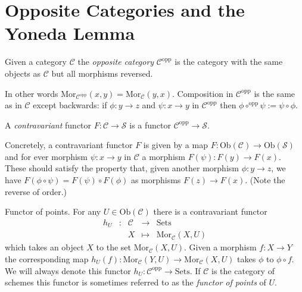 \section{Opposite Categories and the Yoneda Lemma}
\label{section-opposite}

\begin{definition}
\label{definition-opposite}
Given a category $\mathcal{C}$ the {\it opposite category}
$\mathcal{C}^{\text{opp}}$ is the category with the same objects
as $\mathcal{C}$ but all morphisms reversed.
\end{definition}

\noindent
In other
words $\text{Mor}_{\mathcal{C}^{\text{opp}}}(x,y) =
\text{Mor}_{\mathcal{C}}(y,x)$. Composition in $\mathcal{C}^{\text{opp}}$
is the same as in $\mathcal{C}$ except backwards: if $\phi : y \to z$ and
$\psi : x \to y$ in $\mathcal{C}^{\text{opp}}$ then
$\phi \circ^{\text{opp}} \psi := \psi \circ \phi$.

\begin{definition}
\label{definition-contravariant}
A {\it contravariant} functor $F\colon
\mathcal{C}\to \mathcal{S}$ is a functor $\mathcal{C}^{\text{opp}}\to
\mathcal{S}$.
\end{definition}

\noindent
Concretely, a contravariant functor $F$ is given
by a map $F : \text{Ob}(\mathcal{C}) \to 
\text{Ob}(\mathcal{S})$ and for ever morphism
$\psi : x \to y$ in $\mathcal{C}$ a morphism
$F(\psi) : F(y) \to F(x)$. These should satisfy the property
that, given another morphism
$\phi : y \to z$, we have $F(\phi \circ \psi)
= F(\psi) \circ F(\phi)$ as morphisms $F(z) \to F(x)$.
(Note the reverse of order.)

\begin{example}
\label{example-hom-functor}
Functor of points.
For any $U\in \text{Ob}(\mathcal{C})$ there is a contravariant
functor 
$$
\begin{matrix}
h_U & : & \mathcal{C} 
&
\longrightarrow
&
\text{Sets} \\
&&
X
&
\longmapsto
&
\text{Mor}_{\mathcal{C}}(X,U) 
\end{matrix}
$$
which takes an object $X$ to the set
$\text{Mor}_{\mathcal{C}}(X,U)$.
Given a morphism $f\colon X\to Y$ the corresponding map
$h_U(f)\colon
\text{Mor}_{\mathcal{C}}(Y,U)\to \text{Mor}_{\mathcal{C}}(X,U)$ takes
$\phi$ to $\phi\circ f$. We will always denote
this functor $h_U : \mathcal{C}^{\text{opp}} \to \text{Sets}$.
If $\mathcal{C}$ is the category of schemes this functor is
sometimes referred to as the
\emph{functor of points} of $U$.
\end{example}

